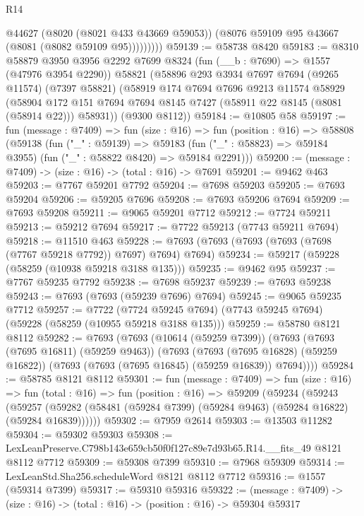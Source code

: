 \begin{lexlean}{R14}
\begin{coremodule}
                @44627
                (@8020 (@8021 @433 @43669 @59053))
                (@8076 @59109 @95 @43667 (@8081 (@8082 @59109 @95)))))))))
@59139 := @58738 @8420
@59183 := @8310
    @58879
    @3950
    @3956
    @2292
    @7699
    @8324
    (fun (__b : @7690) => @1557 (@47976 @3954 @2290))
    @58821
    (@58896
      @293
      @3934
      @7697
      @7694
      (@9265 @11574)
      (@7397 @58821)
      (@58919
        @174
        @7694
        @7696
        @9213
        @11574
        @58929
        (@58904 @172 @151 @7694 @7694 @8145 @7427 (@58911 @22 @8145 (@8081 (@58914 @22))) @58931))
      (@9300 @8112))
@59184 := @10805 @58
@59197 := fun (message : @7409) =>
  fun (size : @16) =>
  fun (position : @16) =>
  @58808
    (@59138
      (fun ("_" : @59139) =>
      @59183 (fun ("_" : @58823) => @59184 @3955) (fun ("_" : @58822 @8420) => @59184 @2291)))
@59200 := (message : @7409) -> (size : @16) -> (total : @16) -> @7691
@59201 := @9462 @463
@59203 := @7767 @59201 @7792
@59204 := @7698 @59203
@59205 := @7693 @59204
@59206 := @59205 @7696
@59208 := @7693 @59206 @7694
@59209 := @7693 @59208
@59211 := @9065 @59201 @7712
@59212 := @7724 @59211
@59213 := @59212 @7694
@59217 := @7722 @59213 (@7743 @59211 @7694)
@59218 := @11510 @463
@59228 := @7693 (@7693 (@7693 (@7693 (@7698 (@7767 @59218 @7792)) @7697) @7694) @7694)
@59234 := @59217 (@59228 (@58259 (@10938 @59218 @3188 @135)))
@59235 := @9462 @95
@59237 := @7767 @59235 @7792
@59238 := @7698 @59237
@59239 := @7693 @59238
@59243 := @7693 (@7693 (@59239 @7696) @7694)
@59245 := @9065 @59235 @7712
@59257 := @7722
    (@7724 @59245 @7694)
    (@7743 @59245 @7694)
    (@59228 (@58259 (@10955 @59218 @3188 @135)))
@59259 := @58780 @8121 @8112
@59282 := @7693
    (@7693
      (@10614 (@59259 @7399))
      (@7693
        (@7693 (@7695 @16811) (@59259 @9463))
        (@7693
          (@7693 (@7695 @16828) (@59259 @16822))
          (@7693 (@7693 (@7695 @16845) (@59259 @16839)) @7694))))
@59284 := @58785 @8121 @8112
@59301 := fun (message : @7409) =>
  fun (size : @16) =>
  fun (total : @16) =>
  fun (position : @16) =>
  @59209
    (@59234
      (@59243
        (@59257 (@59282 (@58481 (@59284 @7399) (@59284 @9463) (@59284 @16822) (@59284 @16839))))))
@59302 := @7959 @2614
@59303 := @13503 @11282
@59304 := @59302 @59303
@59308 := LexLeanPreserve.C798b143e659cb50f0f127c89e7d93b65.R14.__fits_49 @8121 @8112 @7712
@59309 := @59308 @7399
@59310 := @7968 @59309
@59314 := LexLeanStd.Sha256.scheduleWord @8121 @8112 @7712
@59316 := @1557 (@59314 @7399)
@59317 := @59310 @59316
@59322 := (message : @7409) -> (size : @16) -> (total : @16) -> (position : @16) -> @59304 @59317

\end{coremodule}
\end{lexlean}
